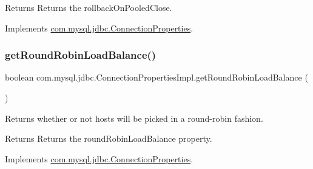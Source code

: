 \begin{DoxyReturn}{Returns}
Returns the rollback\+On\+Pooled\+Close. 
\end{DoxyReturn}


Implements \mbox{\hyperlink{interfacecom_1_1mysql_1_1jdbc_1_1_connection_properties_a8b670aa700956797a853c145974cd285}{com.\+mysql.\+jdbc.\+Connection\+Properties}}.

\mbox{\label{classcom_1_1mysql_1_1jdbc_1_1_connection_properties_impl_ab5b838d6a5a885610d48c21ec6380d84}} 
\subsubsection{\texorpdfstring{get\+Round\+Robin\+Load\+Balance()}{getRoundRobinLoadBalance()}}
{\footnotesize\ttfamily boolean com.\+mysql.\+jdbc.\+Connection\+Properties\+Impl.\+get\+Round\+Robin\+Load\+Balance (\begin{DoxyParamCaption}{ }\end{DoxyParamCaption})}

Returns whether or not hosts will be picked in a round-\/robin fashion.

\begin{DoxyReturn}{Returns}
Returns the round\+Robin\+Load\+Balance property. 
\end{DoxyReturn}


Implements \mbox{\hyperlink{interfacecom_1_1mysql_1_1jdbc_1_1_connection_properties_a48b88c077dbb42077a1fb257aab4558f}{com.\+mysql.\+jdbc.\+Connection\+Properties}}.

\mbox{\label{classcom_1_1mysql_1_1jdbc_1_1_connection_properties_impl_ae79ee1ae8f46db9eaa32d5e01c2d4a6a}} 
